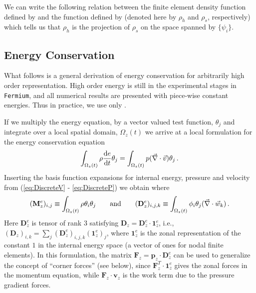 We can write the following relation between the finite element density
function defined by  and the function defined by
 (denoted here by $\rho_h$ and $\rho_s$, respectively)
which tells us that $\rho_h$ is the projection of $\rho_s$ on the space
spanned by $\{\psi_i\}$.

\subsection{Energy Conservation}
What follows is a general derivation of energy conservation for arbitrarily high order representation. High order energy is still in the experimental stages in \texttt{Fermium}, and all numerical results are presented with piece-wise constant energies. Thus in practice, we use only .

If we multiply the energy equation,  by a vector valued test function, $\theta_j$ and integrate over a local spatial domain, $\Omega_z(t)$ we arrive at a local formulation for the energy conservation equation
$$
  \int_{\Omega _z(t)} \rho \frac{\mathrm{d} e}{\mathrm{d}t} \theta_j =
  \int_{\Omega _z(t)} p (\vec \nabla \cdot \vec v) \theta_j\,.
$$
Inserting the basis function expansions for internal energy, pressure and velocity from (\ref{eq:DiscreteV} - \ref{eq:DiscreteP}) we obtain 
where
$$
  (\mathbf{M}^e_z)_{i,j}     \equiv \int_{\Omega _z(t)} \rho \theta_i \theta_j
  \qquad\mbox{and}\qquad
  (\mathbf{D}^e_{z})_{i,j,k} \equiv \int_{\Omega _z(t)} \phi_i \theta_j (\vec \nabla \cdot \vec w_k) \,.
$$
Here $\mathbf{D}^e_{z}$ is tensor of rank 3 satisfying
$\mathbf{D}_{z} = \mathbf{D}^e_{z} \cdot \mathbf{1}^e_z$, i.e.,
$(\mathbf{D}_{z})_{i,k} = \sum_j (\mathbf{D}^e_{z})_{i,j,k} (\mathbf{1}^e_z)_j$,
where $\mathbf{1}^e_z$ is the zonal representation of the constant $1$ in the
internal energy space (a vector of ones for nodal finite elements).  In this
formulation, the matrix $\mathbf{F}_z = \mathbf{p}_z \cdot \mathbf{D}^e_{z}$ can
be used to generalize the concept of ``corner forces'' (see below), since
$\mathbf{F}_z^T \cdot \mathbf{1}^e_z$ gives the zonal forces in the momentum
equation, while $\mathbf{F}_z \cdot \mathbf{v}_z$ is the work term due to
the pressure gradient forces.

